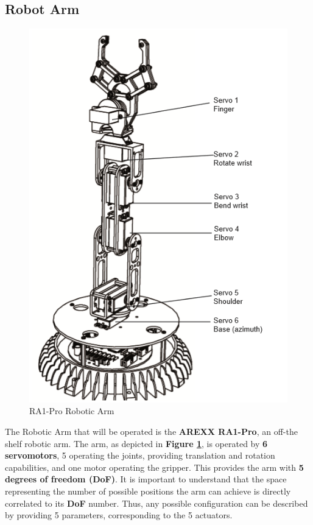 \documentclass[12p,a4paper]{report}
\begin{document}
\subsection{Robot Arm}

\begin{figure}
\includegraphics[scale=0.65]{robotarm}
\caption{RA1-Pro Robotic Arm \cite{arexx}}
\label{fig:robotarm}
\end{figure}

The Robotic Arm that will be operated is the \textbf{AREXX RA1-Pro}, an off-the shelf robotic arm. The arm, as depicted  in \textbf{Figure \ref{fig:robotarm}}, is operated by \textbf{6 servomotors}, 5 operating the joints, providing translation and rotation capabilities, and one motor operating the gripper. This provides the arm with \textbf{5 degrees of freedom (DoF)}. It is important to understand that the space representing the number of possible positions the arm can achieve is directly correlated to its \textbf{DoF} number. Thus, any possible configuration can be described by providing 5 parameters, corresponding to the 5 actuators.
\end{document}
